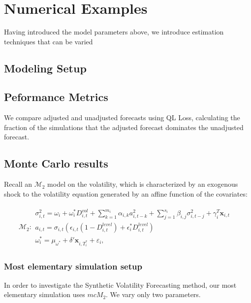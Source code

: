 \documentclass[11pt]{article}
\newcommand{\x}{\textbf{x}}
\def\mbf#1{\mathbf{#1}} %
\def\mc#1{\mathcal{#1}} %
\def\mc#1{\mathcal{#1}}
\theoremstyle{definition}
\begin{document}
\section{Numerical Examples}

Having introduced the model parameters above, we introduce estimation techniques that can be varied

\subsection{Modeling Setup}

\subsection{Peformance Metrics}
We compare adjusted and unadjusted forecasts using QL Loss, calculating the fraction of the simulations that the adjusted forecast dominates the unadjusted forecast.

\subsection{Monte Carlo results}
Recall an $\mc{M}_2$ model on the volatility, which is characterized by an exogenous shock to the volatility equation generated by an affine function of the covariates:

\begin{align*}
\mc{M}_2 \colon \begin{array}{l}
   \sigma^{2}_{i,t} = \omega_{i} + \omega^{*}_i D^{vol}_{i,t} + \sum^{m_{i}}_{k=1}\alpha_{i,k}a^{2}_{i,t-k} + \sum_{j=1}^{s_{i}}\beta_{i,j}\sigma_{i,t-j}^{2} + \gamma_{i}^{T} \x_{i,t} \text{ }\\[.2cm]
   a_{i,t} = \sigma_{i,t}(\epsilon_{i,t}(1-D^{level}_{i,t}) + \epsilon^{*}_{i}D^{level}_{i,t})\\[.2cm]
   \omega_i^{*} = \mu_{\omega^{*}}+\delta'\mbf{x}_{i, T_i^*}+ \varepsilon_{i},
\end{array}
\end{align*}

\subsubsection{Most elementary simulation setup}

In order to investigate the Synthetic Volatility Forecasting method, our most elementary simulation uses $mc{M}_2$.  We vary only two parameters. 
\end{document}
